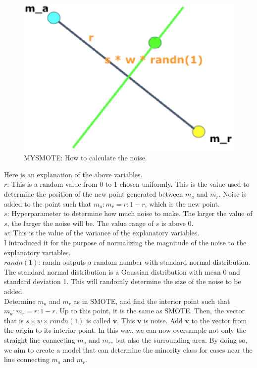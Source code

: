 \begin{center}
    \begin{figure}[ht]
        \caption{MYSMOTE: How to calculate the noise.}
        \label{tab:team-rating-features}
        \begin{center}
            \includegraphics[scale=0.6]{image/mysmote1.eps}
        \end{center}
    \end{figure}
\end{center}

Here is an explanation of the above variables.\\ 
$r$: This is a random value from $0$ to $1$ chosen uniformly.
This is the value used to determine the position of the new point generated between $m_a$ and $m_r$.
Noise is added to the point such that $m_a:m_r=r:1-r$, which is the new point.\\
$s$: Hyperparameter to determine how much noise to make.
The larger the value of $s$, the larger the noise will be.
The value range of $s$ is above 0.\\
$w$: This is the value of the variance of the explanatory variables.\\
I introduced it for the purpose of normalizing the magnitude of the noise to the explanatory variables.\\
$randn(1)$: randn outputs a random number with standard normal distribution.
The standard normal distribution is a Gaussian distribution with mean 0 and standard deviation 1.
This will randomly determine the size of the noise to be added.\\


Determine $m_a$ and $m_r$ as in SMOTE, and find the interior point such that $m_a:m_r=r:1-r$.
Up to this point, it is the same as SMOTE.
Then, the vector that is $s \times w \times randn(1)$ is called $\bm{v}$.
This $\bm{v}$ is noise.
Add $\bm{v}$ to the vector from the origin to its interior point.
In this way, we can now oversample not only the straight line connecting $m_a$ and $m_r$, but also the surrounding area.
By doing so, we aim to create a model that can determine the minority class for cases near the line connecting $m_a$ and $m_r$.



